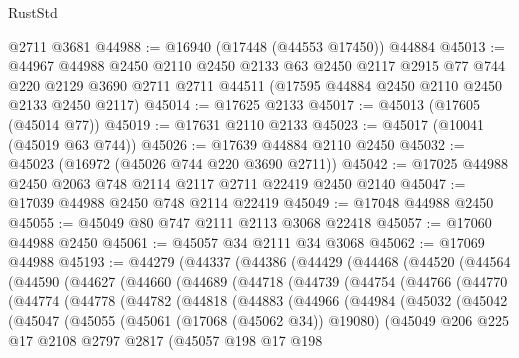 \begin{lexlean}{RustStd}
\begin{coremodule}
    @2711
    @3681
@44988 := @16940 (@17448 (@44553 @17450)) @44884
@45013 := @44967
    @44988
    @2450
    @2110
    @2450
    @2133
    @63
    @2450
    @2117
    @2915
    @77
    @744
    @220
    @2129
    @3690
    @2711
    @2711
    @44511
    (@17595 @44884 @2450 @2110 @2450 @2133 @2450 @2117)
@45014 := @17625 @2133
@45017 := @45013 (@17605 (@45014 @77))
@45019 := @17631 @2110 @2133
@45023 := @45017 (@10041 (@45019 @63 @744))
@45026 := @17639 @44884 @2110 @2450
@45032 := @45023 (@16972 (@45026 @744 @220 @3690 @2711))
@45042 := @17025 @44988 @2450 @2063 @748 @2114 @2117 @2711 @22419 @2450 @2140
@45047 := @17039 @44988 @2450 @748 @2114 @22419
@45049 := @17048 @44988 @2450
@45055 := @45049 @80 @747 @2111 @2113 @3068 @22418
@45057 := @17060 @44988 @2450
@45061 := @45057 @34 @2111 @34 @3068
@45062 := @17069 @44988
@45193 := @44279
    (@44337
      (@44386
        (@44429
          (@44468
            (@44520
              (@44564
                (@44590
                  (@44627
                    (@44660
                      (@44689
                        (@44718
                          (@44739
                            (@44754
                              (@44766
                                (@44770
                                  (@44774
                                    (@44778
                                      (@44782
                                        (@44818
                                          (@44883
                                            (@44966
                                              (@44984
                                                (@45032
                                                  (@45042
                                                    (@45047
                                                      (@45055
                                                        (@45061 (@17068 (@45062 @34)) @19080)
                                                        (@45049
                                                          @206
                                                          @225
                                                          @17
                                                          @2108
                                                          @2797
                                                          @2817
                                                          (@45057
                                                            @198
                                                            @17
                                                            @198

\end{coremodule}
\end{lexlean}

